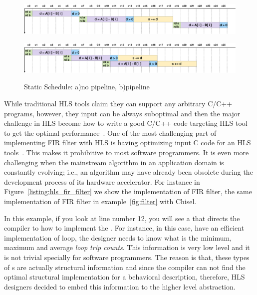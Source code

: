 \begin{figure}[!h]
    \begin{minipage}[t]{\linewidth}
        \centering
        \includegraphics[width=1\textwidth]{figures/Introduction/schedule.pdf}
        \label{fig:no_pipeline}
    \end{minipage}
    \hspace{0.1cm}
    \begin{minipage}[t]{\linewidth} 
        \centering
        \includegraphics[width=1\textwidth]{figures/Introduction/schedule_pipe.pdf}
        \label{fig:pipeline}
    \end{minipage}        
    \label{fig:schedule}
    \caption{Static Schedule: a)no pipeline, b)pipeline}
\end{figure}  



While traditional HLS tools claim they can support any arbitrary C/C++ programs, however, they input can be always suboptimal and then the major challenge in HLS become how to write a good C/C++ code targeting HLS tool to get the optimal performance~\cite{cong_2018_best}.
One of the most challenging part of implementing FIR filter with HLS is having optimizing input C code for an HLS tools~\cite{cong_2018_best}.
This makes it prohibitive to most software programmers. It is even more challenging when the mainstream algorithm in an application domain is constantly evolving; i.e., an algorithm may have already been obsolete during the development process of its hardware accelerator.
For instance in Figure~\ref{listing:hls_fir_filter} we show the implementation of FIR filter, the same implementation of FIR filter in example~\ref{fig:filter} with Chisel.

In this example, if you look at line number 12, you will see a  that directs the compiler to how to implement the .
For instance, in this case, have an efficient implementation of  loop, the designer needs to know what is the minimum, maximum and average \textit{loop trip counts}.
This information is very low level and it is not trivial specially for software programmers.
The reason is that, these types of s are actually structural information and since the compiler can not find the optimal structural implementation for a behavioral description, therefore, HLS designers decided to embed this information to the higher level abstraction.

